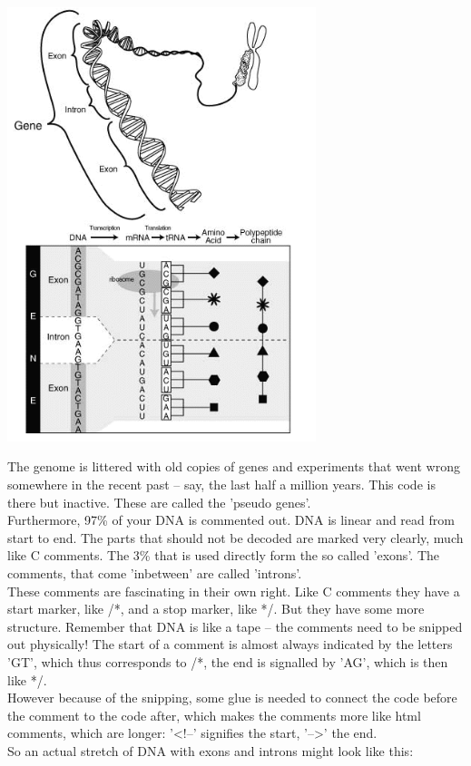 \documentclass[11pt,twoside,a4paper]{article}
\begin{document}
\begin{minipage}[ht]{9.25cm}
	\includegraphics[width=9.0cm]{img/intron.png}
\end{minipage} \hfill \begin{minipage}[ht]{9.75cm}
	The genome is littered with old copies of genes and experiments that went wrong somewhere in the recent past -- say, the last half a million years. This code is there but inactive. These are called the 'pseudo genes'. ~\\

	Furthermore, 97\% of your DNA is commented out. DNA is linear and read from start to end. The parts that should not be decoded are marked very clearly, much like C comments. The 3\% that is used directly form the so called 'exons'. The comments, that come 'inbetween' are called 'introns'. ~\\
	
	These comments are fascinating in their own right. Like C comments they have a start marker, like /*, and a stop marker, like */. But they have some more structure. Remember that DNA is like a tape -- the comments need to be snipped out physically! The start of a comment is almost always indicated by the letters 'GT', which thus corresponds to /*, the end is signalled by 'AG', which is then like */. ~\\
	
	However because of the snipping, some glue is needed to connect the code before the comment to the code after, which makes the comments more like html comments, which are longer: '<!--' signifies the start, '-->' the end. ~\\
	
	So an actual stretch of DNA with exons and introns might look like this:
\end{minipage}
\end{document}
